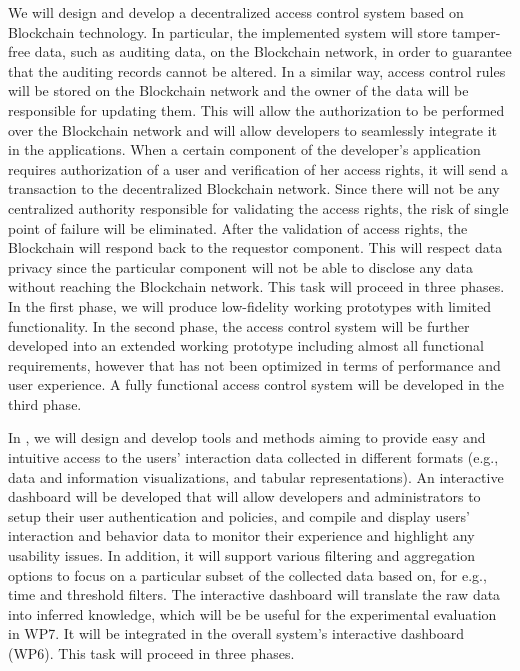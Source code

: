 \begin{Workpackage}{\thewpno}
\begin{Task}
\TaskResults{%
\ref{del:auth2},
\ref{del:auth3},
\ref{del:auth4}
}
\TaskHeader{}
We will design and develop a decentralized access control system based on Blockchain technology. In particular, the implemented system will store tamper-free data, such as auditing data, on the Blockchain network, in order to guarantee that the auditing records cannot be altered. In a similar way, access control rules will be stored on the Blockchain network and the owner of the data will be responsible for updating them. This will allow the authorization to be performed over the Blockchain network and will allow developers to seamlessly integrate it in the applications. When a certain component of the developer's application requires authorization of a user and verification of her access rights, it will send a transaction to the decentralized Blockchain network. Since there will not be any centralized authority responsible for validating the access rights, the risk of single point of failure will be eliminated. After the validation of access rights, the Blockchain will respond back to the requestor component. This will respect data privacy since the particular component will not be able to disclose any data without reaching the Blockchain network. This task will proceed in three phases. In the first phase, we will produce low-fidelity working prototypes with limited functionality. In the second phase, the access control system will be further developed into an extended working prototype including almost all functional requirements, however that has not been optimized in terms of performance and user experience. A fully functional access control system will be developed in the third phase.
\end{Task}


\begin{Task}
\TaskResults{%
\ref{del:auth2},
\ref{del:auth3},
\ref{del:auth4}
}
\TaskHeader{}

In \theTask, we will design and develop tools and methods aiming to provide easy and intuitive access to the users’ interaction data collected in different formats (e.g., data and information visualizations, and tabular representations). An interactive dashboard will be developed that will allow developers and administrators to setup their user authentication and policies, and compile and display users’ interaction and behavior data to monitor their experience and highlight any usability issues. In addition, it will support various filtering and aggregation options to focus on a particular subset of the collected data based on, for e.g., time and threshold filters. The interactive dashboard will translate the raw data into inferred knowledge, which will be be useful for the experimental evaluation in WP7. It will be integrated in the overall system's interactive dashboard (WP6). This task will proceed in three phases. 
\end{Task}


\end{Workpackage}
